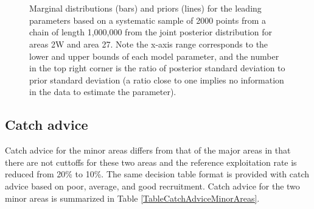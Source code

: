  \begin{figure}[!tbp]
	\centering
	\\
	\\
	\caption{Marginal distributions (bars) and priors (lines) for the leading parameters based on a systematic sample of 2000 points from a chain of length 1,000,000 from the joint posterior distribution for areas 2W and area 27.  Note the x-axis range corresponds to the lower and upper bounds of each model parameter, and the number in the top right corner is the ratio of posterior standard deviation to prior standard deviation (a ratio close to one implies no information in the data to estimate the parameter).}\label{Results:Minor:mcmcMarginals}
\end{figure}

\subsection{Catch advice}
Catch advice for the minor areas differs from that of the major areas in that there are not cuttoffs for these two areas and the reference exploitation rate is reduced from 20\% to 10\%.  The same decision table format is provided with catch advice based on poor, average, and good recruitment. Catch advice for the two minor areas is summarized in Table \ref{TableCatchAdviceMinorAreas}.



















